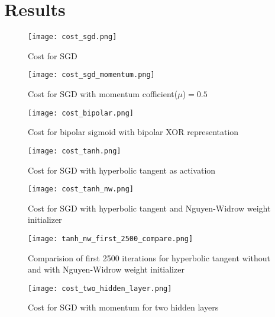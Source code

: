 \section{Results}

\begin{figure}[!ht]
  \texttt{[image: cost\_sgd.png]}
  \caption{Cost for SGD}
  \label{fig:cost_sgd}
\end{figure}

\begin{figure}[!ht]
  \texttt{[image: cost\_sgd\_momentum.png]}
  \caption{Cost for SGD with momentum cofficient($\mu$)$=0.5$}
  \label{fig:cost_sgd_momentum}
\end{figure}

\begin{figure}[!ht]
  \texttt{[image: cost\_bipolar.png]}
  \caption{Cost for bipolar sigmoid with bipolar XOR representation}
  \label{fig:cost_bipolar}
\end{figure}

\begin{figure}[!ht]
  \texttt{[image: cost\_tanh.png]}
  \caption{Cost for SGD with hyperbolic tangent as activation}
  \label{fig:cost_tanh}
\end{figure}

\begin{figure}[!ht]
  \texttt{[image: cost\_tanh\_nw.png]}
  \caption{Cost for SGD with hyperbolic tangent and Nguyen-Widrow weight initializer}
  \label{fig:cost_tanh_nw}
\end{figure}

\begin{figure}[!ht]
  \texttt{[image: tanh\_nw\_first\_2500\_compare.png]}
  \caption{Comparision of first 2500 iterations for hyperbolic tangent without and with Nguyen-Widrow weight initializer}
  \label{fig:tanh_nw_first_2500_compare}
\end{figure}

\begin{figure}[!ht]
  \texttt{[image: cost\_two\_hidden\_layer.png]}
  \caption{Cost for SGD with momentum for two hidden layers}
  \label{fig:cost_two_hidden_layer}
\end{figure}
